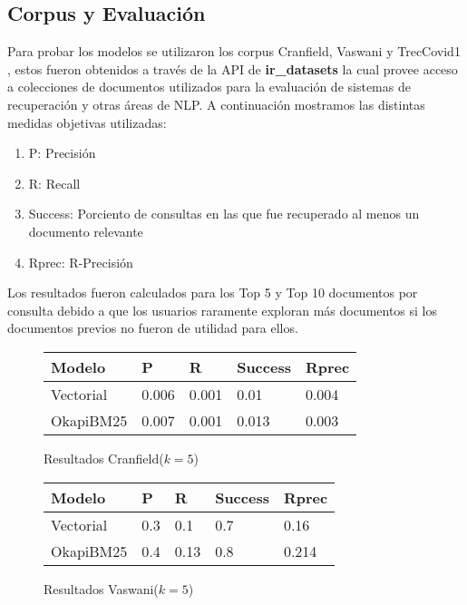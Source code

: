\documentclass[a4paper,10pt,twocolumn]{article}
\begin{document}
	\subsection{Corpus y Evaluaci\'on}\label{sub:figures}
	Para probar los modelos se utilizaron los corpus Cranfield, Vaswani y TrecCovid1 , estos fueron obtenidos a trav\'es de la API de \textbf{ir\_datasets} la cual provee acceso a colecciones de documentos
	utilizados para la evaluaci\'on de sistemas de recuperaci\'on y otras \'areas de NLP.
    A continuaci\'on mostramos las distintas medidas objetivas utilizadas:
    \begin{enumerate}
        \item P: Precisi\'on
        \item R: Recall
        \item Success: Porciento de consultas en las que fue recuperado al menos un documento relevante
        \item Rprec: R-Precisi\'on
    \end{enumerate}

    Los resultados fueron calculados para los Top 5 y Top 10 documentos por consulta debido a que los usuarios raramente exploran m\'as documentos 
    si los documentos previos no fueron de utilidad para ellos.

    \begin{figure}[!htb]%
    \begin{tabular}{| l | l | l | l | l|}
        \hline
        Modelo & P & R & Success & Rprec\\ \hline
        Vectorial & 0.006 & 0.001 & 0.01 & 0.004\\
        OkapiBM25 & 0.007 & 0.001 & 0.013 & 0.003\\
    \end{tabular}
    \caption{Resultados Cranfield($k=5$)}
	\end{figure}

    \begin{figure}[h]%
        \begin{tabular}{| l | l | l | l | l|}
            \hline
            Modelo & P & R & Success & Rprec\\ \hline
            Vectorial & 0.3 & 0.1 & 0.7 & 0.16\\
            OkapiBM25 & 0.4 & 0.13 & 0.8 & 0.214\\
        \end{tabular}
        \caption{Resultados Vaswani($k=5$)}
    \end{figure}
\end{document}
